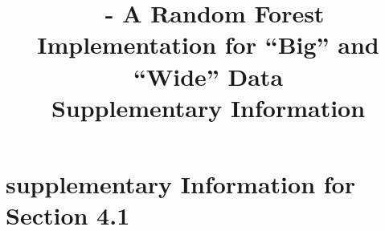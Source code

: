 \documentclass[11pt]{article}
\title{\cursedforest\ - A Random Forest Implementation for ``Big'' and ``Wide'' Data \\
Supplementary Information}
\author{}
\date{}
\begin{document}
\maketitle






\section{supplementary Information for Section 4.1}
\end{document}
